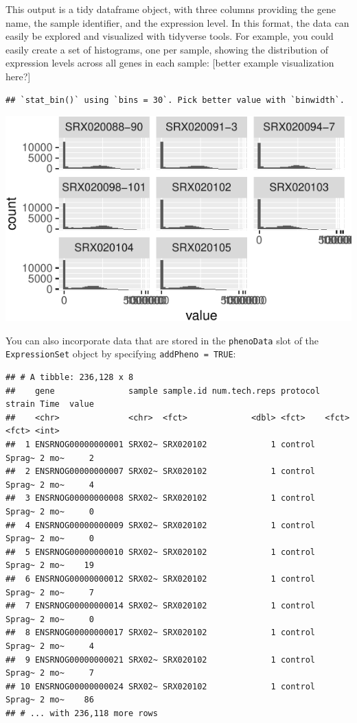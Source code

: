 \documentclass[]{tufte-book}
\begin{document}
This output is a tidy dataframe object, with three columns providing the
gene name, the sample identifier, and the expression level. In this format,
the data can easily be explored and visualized with tidyverse tools. For example,
you could easily create a set of histograms, one per sample, showing the
distribution of expression levels across all genes in each sample:
{[}better example visualization here?{]}

\begin{verbatim}
## `stat_bin()` using `bins = 30`. Pick better value with `binwidth`.
\end{verbatim}

\includegraphics{improve_repro_files/figure-latex/unnamed-chunk-22-1}

You can also incorporate data that are stored in the \texttt{phenoData} slot of
the \texttt{ExpressionSet} object by specifying \texttt{addPheno\ =\ TRUE}:

\begin{verbatim}
## # A tibble: 236,128 x 8
##    gene               sample sample.id num.tech.reps protocol strain Time  value
##    <chr>              <chr>  <fct>             <dbl> <fct>    <fct>  <fct> <int>
##  1 ENSRNOG00000000001 SRX02~ SRX020102             1 control  Sprag~ 2 mo~     2
##  2 ENSRNOG00000000007 SRX02~ SRX020102             1 control  Sprag~ 2 mo~     4
##  3 ENSRNOG00000000008 SRX02~ SRX020102             1 control  Sprag~ 2 mo~     0
##  4 ENSRNOG00000000009 SRX02~ SRX020102             1 control  Sprag~ 2 mo~     0
##  5 ENSRNOG00000000010 SRX02~ SRX020102             1 control  Sprag~ 2 mo~    19
##  6 ENSRNOG00000000012 SRX02~ SRX020102             1 control  Sprag~ 2 mo~     7
##  7 ENSRNOG00000000014 SRX02~ SRX020102             1 control  Sprag~ 2 mo~     0
##  8 ENSRNOG00000000017 SRX02~ SRX020102             1 control  Sprag~ 2 mo~     4
##  9 ENSRNOG00000000021 SRX02~ SRX020102             1 control  Sprag~ 2 mo~     7
## 10 ENSRNOG00000000024 SRX02~ SRX020102             1 control  Sprag~ 2 mo~    86
## # ... with 236,118 more rows
\end{verbatim}
\end{document}
